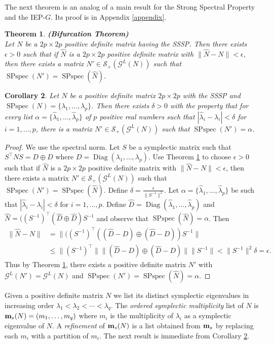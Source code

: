 \documentclass[12pt]{article}
\newtheorem{thm}{Theorem}[section]
\newtheorem{cor}[thm]{Corollary}
\theoremstyle{definition}
\theoremstyle{definition}
\theoremstyle{definition}
\numberwithin{figure}{section}
\numberwithin{equation}{section}
\newcommand{\G}{\mathcal{G}}
\newcommand{\symp}{\mathcal{S}_+}
\newcommand{\soml}{{\bf m}_s}
\newcommand{\trans}{^{\top}}
\newcommand{\diag}{\operatorname{Diag}}
\newcommand{\spspec}{\operatorname{SPspec}}
\newcommand{\lam}{\lambda}
\newcommand{\bpf}{\begin{proof}}
\newcommand{\epf}{\end{proof}\ms}
\newcommand{\ms}{\medskip}
\newcommand{\wh}{\widehat}
\begin{document}
The next theorem  is an analog of a main result for the Strong Spectral Property and the IEP-$G$.  Its proof is in Appendix \ref{appendix}.

\begin{thm}\label{Thm:bifurcation}{\rm \bf (Bifurcation Theorem) }
\\
Let $N$ be a $2p \times 2p$ positive definite matrix having the SSSP.  
Then there exists $\epsilon>0$ such that if $\widehat{N} $ is a $2p\times 2p $ positive definite matrix 
with $\| \widehat{N}- N \| <\epsilon$, then there exists a 
matrix  $N'\in \symp(\G^L(N))$ such that $\spspec(N')=\spspec(\wh N)$.
\end{thm}

\begin{cor}\label{c:bifur-close}
Let $N$ be a  positive definite matrix $2p\times 2p $ with the SSSP and $\spspec(N)=\{\lam_1,\dots,\lam_p\}$. 
Then there exists $\delta>0$   {with the property that}   for every list $\alpha=\{\hat\lam_1,\dots,\hat\lam_p\}$ of $p$ positive real numbers such that $|\hat\lam_i-\lam_i|<\delta$ for $i=1,\dots,p$,  there is a matrix $N'\in \symp(\G^L(N))$ such that $\spspec(N')=\alpha$.
\end{cor}
\bpf We use the spectral norm.
Let $S$ be a symplectic matrix such that $S\trans NS=D\oplus D$ where $D=\diag(\lam_1,\dots,\lam_p)$.
Use Theorem \ref{Thm:bifurcation} to choose $\epsilon>0$  such that if $\widehat{N} $ is a $2p\times 2p $ positive definite matrix 
with $\| \widehat{N}- N \| <\epsilon$, then there exists a matrix  $N'\in\symp(\G^L (N))$ such that
 $\spspec(N')=\spspec(\widehat{N})$. Define $\delta=\frac\epsilon{\|S^{-1}\|^2}$. Let $\alpha=\{\hat\lam_1,\dots,\hat\lam_p\}$ be such that $|\hat\lam_i-\lam_i|<\delta$ for $i=1,\dots,p$.  Define $\wh D=\diag(\hat \lam_1,\dots,\hat \lam_p)$ and $\wh N=((S^{-1})\trans(\wh D\oplus \wh D)S^{-1}$ and observe that $\spspec(\wh N)=\alpha$.  Then 
\begin{align}\nonumber
\|\wh N-N\|&=\|((S^{-1})\trans((\wh D-D)\oplus (\wh D-D)) S^{-1}\|\\ 
\nonumber
&\le \|(S^{-1})\trans \| \|(\wh D-D)\oplus (\wh D-D)\| \|S^{-1}\|< \| S^{-1}\|^2\delta=\epsilon.
\end{align} 
Thus by Theorem \ref{Thm:bifurcation}, there exists a positive definite  matrix $N'$  with $\G^L(N')=\G^L(N)$ and $\spspec(N')=\spspec(\widehat{N})=\alpha$. \epf

  Given a positive definite matrix $N$ we list its distinct symplectic eigenvalues in increasing order 
$\lambda_1<  \lambda_2< \cdots< \lambda_q$.
  The \textit{ordered symplectic multiplicity} list of $N$ 
is  $\soml(N)=(m_1, \ldots, m_q)$  where $m_i$ is the multiplicity of $\lambda_i$
as a symplectic eigenvalue of $N$.  A \emph{refinement} of $\soml(N)$ is a list obtained from $\soml$ by replacing
each $m_i$ with a partition of $m_i$. 
 The next result is immediate from Corollary \ref{c:bifur-close}.
\end{document}
